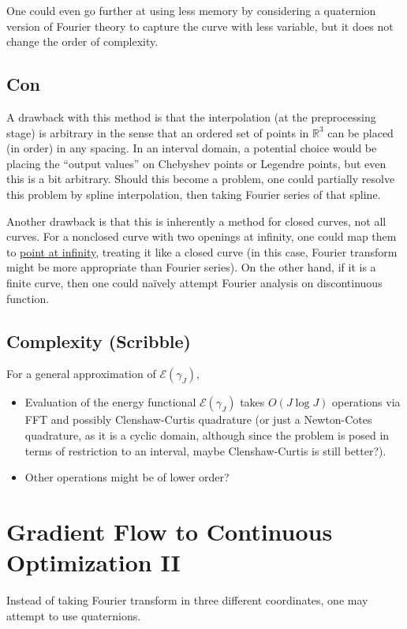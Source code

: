 \documentclass[a4paper]{article}
\theoremstyle{definition}
\begin{document}
One could even go further at using less memory by considering a quaternion version of Fourier theory to capture the curve with less variable, but it does not change the order of complexity.

\subsection{Con}
A drawback with this method is that the interpolation (at the preprocessing stage) is arbitrary in the sense that an ordered set of points in $\mathbb{R}^3$ can be placed (in order) in any spacing.
In an interval domain, a potential choice would be placing the ``output values'' on Chebyshev points or Legendre points, but even this is a bit arbitrary.
Should this become a problem, one could partially resolve this problem by spline interpolation, then taking Fourier series of that spline.

Another drawback is that this is inherently a method for closed curves, not all curves. For a nonclosed curve with two openings at infinity, one could map them to \underline{point at infinity}, treating it like a closed curve (in this case, Fourier transform might be more appropriate than Fourier series). On the other hand, if it is a finite curve, then one could na\"ively attempt Fourier analysis on discontinuous function.


\subsection{Complexity (Scribble)}
For a general approximation of $\mathcal{E}\left( \gamma_J \right)$,
\begin{itemize}
    \item Evaluation of the energy functional $\mathcal{E} \left( \gamma_J \right)$ takes $O\left( J \log J \right)$ operations via FFT and possibly Clenshaw-Curtis quadrature (or just a Newton-Cotes quadrature, as it is a cyclic domain, although since the problem is posed in terms of restriction to an interval, maybe Clenshaw-Curtis is still better?).
    \item Other operations might be of lower order? 
\end{itemize}

\section{Gradient Flow to Continuous Optimization II}
Instead of taking Fourier transform in three different coordinates, one may attempt to use quaternions.
\end{document}
